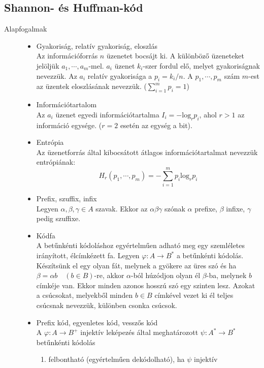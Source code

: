\documentclass[margin=0px]{article}
\begin{document}
		\subsection{Shannon- és Huffman-kód}
			\begin{description}
				\item[Alapfogalmak] \hfill
					\begin{itemize}
						\item Gyakoriság, relatív gyakoriság, eloszlás \\
							Az információforrás $n$ üzenetet bocsájt ki. A különböző üzeneteket jelöljük $a_1, \cdots, a_m$-mel. $a_i$ üzenet $k_i$-szer fordul elő, melyet gyakoriságnak nevezzük. Az $a_i$ relatív gyakorisága a $p_i = k_i/n$. A $p_1,\cdots,p_m$ szám $m$-est az üzentek eloszlásának nevezzük. ($\sum_{i=1}^{m}p_i = 1$)
						\item Információtartalom \\
							Az $a_i$ üzenet egyedi információtartalma $I_i = - \text{log}_rp_i$, ahol $r>1$ az információ egysége. ($r=2$ esetén az egység a bit).
						\item Entrópia \\
							Az üzenetforrás által kibocsátott átlagos információtartalmat nevezzük entrópiának:
							\[H_r(p_1, \cdots, p_m) = - \sum\limits_{i=1}^{m}p_i\text{log}_rp_i  \]
						\item Prefix, szuffix, infix \\
							Legyen $\alpha, \beta, \gamma \in A$ szavak. Ekkor az $\alpha\beta\gamma$ szónak $\alpha$ prefixe, $\beta$ infixe, $\gamma$ pedig szuffixe.
						\item Kódfa \\
							A betűnkénti kódoláshoz egyértelműen adható meg egy szemléletes irányított, élcímkézett fa. Legyen $\varphi : A \rightarrow B^*$ a betűnkénti kódolás. Készítsünk el egy olyan fát, melynek a gyökere az üres szó és ha $\beta = \alpha b\quad (b\in B)$-re, akkor $\alpha$-ból húzódjon olyan él $\beta$-ba, melynek $b$ címkéje van. Ekkor minden azonos hosszú szó egy szinten lesz. Azokat a csúcsokat, melyekből minden $b\in B$ címkével vezet ki él teljes csúcsnak nevezzük, különben csonka csúcsok.
						\item Prefix kód, egyenletes kód, vesszős kód \\
							A $\varphi : A \rightarrow B^+$ injektív leképezés által meghatározott $\psi : A^* \rightarrow B^*$ betűnkénti kódolás
							\begin{enumerate}
								\item felbontható (egyértelműen dekódolható), ha $\psi$ injektív

\end{enumerate}
\end{itemize}
\end{description}
\end{document}
